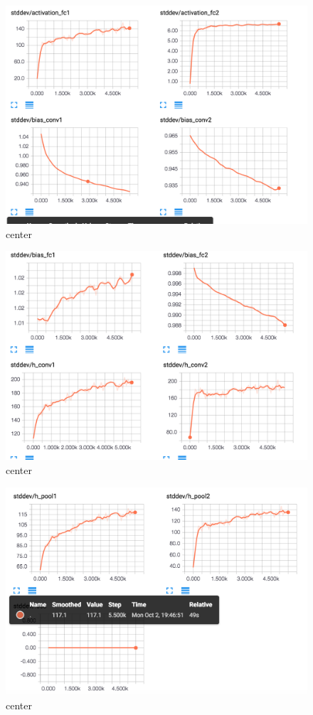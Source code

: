 \documentclass[12pt]{article}
\begin{document}
\begin{figure}[H]
  \caption{center}
  \centering
    \includegraphics[scale=0.3]{bst2.png}
\end{figure}
\begin{figure}[H]
  \caption{center}
  \centering
    \includegraphics[scale=0.3]{bst3.png}
\end{figure}
\begin{figure}[H]
  \caption{center}
  \centering
    \includegraphics[scale=0.3]{bst4.png}
\end{figure}
\end{document}
